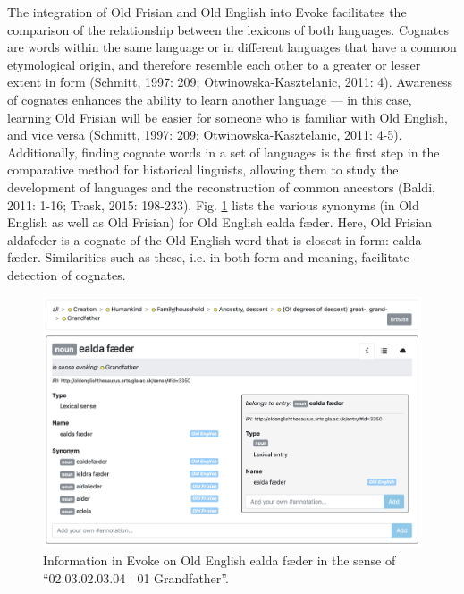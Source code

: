 The integration of Old Frisian and Old English into Evoke facilitates the comparison of the relationship between the lexicons of both languages. Cognates are words within the same language or in different languages that have a common etymological origin, and therefore resemble each other to a greater or lesser extent in form (Schmitt, 1997: 209; Otwinowska-Kasztelanic, 2011: 4). Awareness of cognates enhances the ability to learn another language — in this case, learning Old Frisian will be easier for someone who is familiar with Old English, and vice versa (Schmitt, 1997: 209; Otwinowska-Kasztelanic, 2011: 4-5).  Additionally, finding cognate words in a set of languages is the first step in the comparative method for historical linguists, allowing them to study the development of languages and the reconstruction of common ancestors (Baldi, 2011: 1-16; Trask, 2015: 198-233). Fig. \ref{fig:Stolk2021b:Fig3} lists the various synonyms (in Old English as well as Old Frisian) for Old English ealda fæder. Here, Old Frisian aldafeder is a cognate of the Old English word that is closest in form: ealda fæder. Similarities such as these, i.e. in both form and meaning, facilitate detection of cognates.

\begin{figure}[htbp]
	\includegraphics[width=\textwidth]{Stolk2021b/fig/Fig3.png}
	\caption[]{\label{fig:Stolk2021b:Fig3} Information in Evoke on Old English ealda fæder in the sense of “02.03.02.03.04 | 01 Grandfather”.}
\end{figure}

